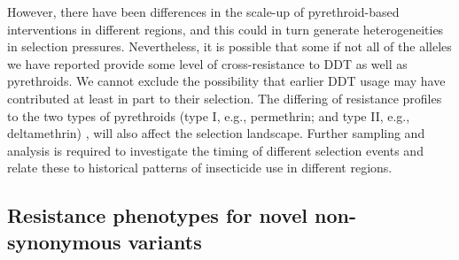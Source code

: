 \documentclass[a4paper,11pt,abstracton,hidelinks]{scrartcl}
\begin{document}
%
However, there have been differences in the scale-up of pyrethroid-based interventions in different regions, and this could in turn generate heterogeneities in selection pressures.
%
Nevertheless, it is possible that some if not all of the alleles we have reported provide some level of cross-resistance to DDT as well as pyrethroids.
%
We cannot exclude the possibility that earlier DDT usage may have contributed at least in part to their selection.
%
The differing of resistance profiles to the two types of pyrethroids (type I, e.g., permethrin; and type II, e.g., deltamethrin) \cite{Hu2011}, will also affect the selection landscape.
%
Further sampling and analysis is required to investigate the timing of different selection events and relate these to historical patterns of insecticide use in different regions.


\subsection*{Resistance phenotypes for novel non-synonymous variants}
\end{document}
